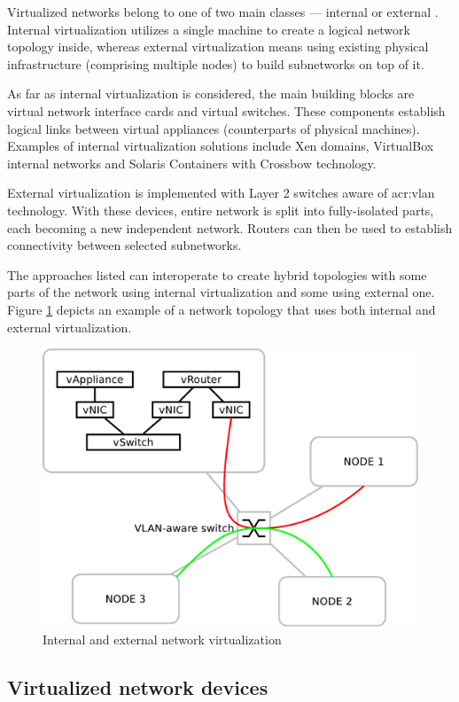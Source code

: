 \documentclass[11pt,openany]{book}
\begin{document}
        Virtualized networks belong to one of two main classes --- internal or external \cite{nsag}. Internal
        virtualization utilizes a single machine to create a logical network topology inside, whereas external
        virtualization means using existing physical infrastructure (comprising multiple nodes) to build subnetworks on
        top of it.

        As far as internal virtualization is considered, the main building blocks are virtual network interface cards
        and virtual switches. These components establish logical links between virtual appliances (counterparts of
        physical machines). Examples of internal virtualization solutions include Xen domains, VirtualBox internal
        networks \cite{vboxum} and Solaris Containers with Crossbow technology.

        External virtualization is implemented with Layer 2 switches aware of \gls{acr:vlan} technology. With these
        devices, entire network is split into fully-isolated parts, each becoming a new independent network. Routers can
        then be used to establish connectivity between selected subnetworks.

        The approaches listed can interoperate to create hybrid topologies with some parts of the network using internal
        virtualization and some using external one. Figure \ref{fig:ctx:nvtypes} depicts an example of a network
        topology that uses both internal and external virtualization.
        
        \begin{figure}[H]
          \centering
          \includegraphics[width=.5\textwidth]{img/ctx/vnet-types.pdf}

          \caption{Internal and external network virtualization}
          \label{fig:ctx:nvtypes}
        \end{figure}


      \subsection{Virtualized network devices}
\end{document}
